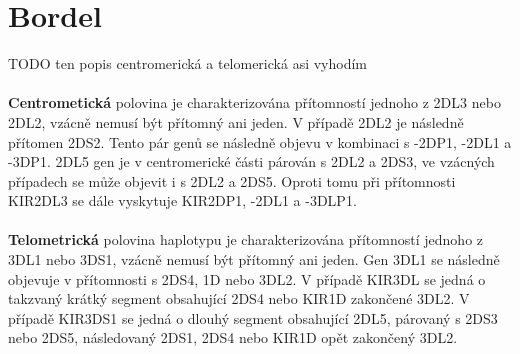 \documentclass[czech,DP]{thesiskiv}
\numberwithin{equation}{section}
\begin{document}
\section{Bordel}
TODO ten popis centromerická a telomerická asi vyhodím
\\
\\
\noindent 
\textbf{Centrometická} polovina je charakterizována přítomností jednoho z 2DL3 nebo 2DL2, vzácně nemusí být přítomný ani jeden. V případě 2DL2 je následně přítomen 2DS2. Tento pár genů se následně objevu v kombinaci s -2DP1, -2DL1 a -3DP1. 2DL5 gen je v centromerické části párován s 2DL2 a 2DS3, ve vzácných případech se může objevit i s 2DL2 a 2DS5. Oproti tomu při přítomnosti KIR2DL3 se dále vyskytuje KIR2DP1, -2DL1 a -3DLP1.
\\
\\
\textbf{Telometrická} polovina haplotypu je charakterizována přítomností jednoho z 3DL1 nebo 3DS1, vzácně nemusí být přítomný ani jeden. Gen 3DL1 se následně objevuje v přítomnosti s 2DS4, 1D nebo 3DL2. V případě KIR3DL se jedná o takzvaný krátký segment obsahující 2DS4 nebo KIR1D zakončené 3DL2. V případě KIR3DS1 se jedná o dlouhý segment obsahující 2DL5, párovaný s 2DS3 nebo 2DS5, následovaný 2DS1, 2DS4 nebo KIR1D opět zakončený 3DL2. \cite{KIR_haplotypy_ct}
\\
\end{document}
